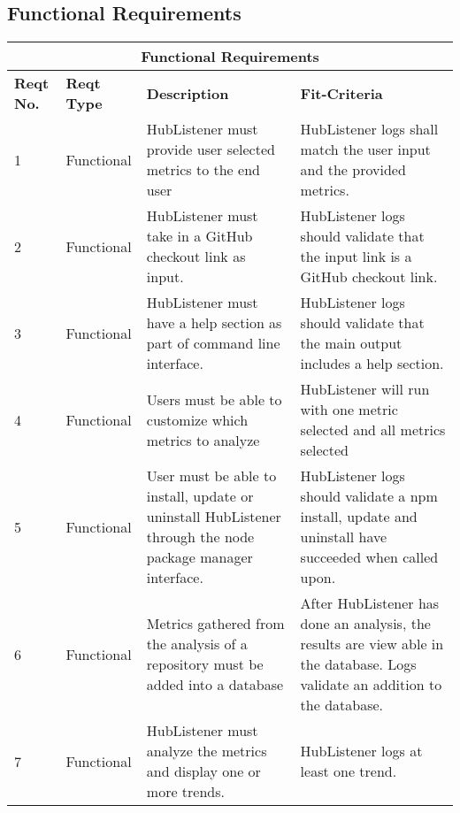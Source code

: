 \documentclass{article}
\begin{document}
\subsection{Functional Requirements }
\begin{tabular}{ |p{1cm}|p{2cm}|p{5cm}|p{3cm}|  }
\hline
\multicolumn{4}{|c|}{\textbf{Functional Requirements}} \\
\hline
\textbf{Reqt No.} & \textbf{Reqt Type} & \textbf{Description} & \textbf{Fit-Criteria}\\
\hline 
1 & Functional & HubListener must provide user selected metrics to the end user & HubListener logs shall match the user input and the provided metrics.\\
\hline 
2 & Functional & HubListener must take in a GitHub checkout link as input. & HubListener logs should validate that the input link is a GitHub checkout link.\\
\hline 
3 & Functional & HubListener must have a help section as part of command line interface. & HubListener logs should validate that the main output includes a help section.\\ 
\hline 
4 & Functional & Users must be able to customize which metrics to analyze & HubListener will run with one metric selected and all metrics selected\\
\hline 
5 & Functional & User must be able to install, update or uninstall HubListener through the node package manager interface. & HubListener logs should validate a npm install, update and uninstall have succeeded when called upon. \\
\hline 
6 & Functional & Metrics gathered from the analysis of a repository must be added into a database & After HubListener has done an analysis, the results are view able in the database. Logs validate an addition to the database.  \\
\hline 
7 & Functional & HubListener must analyze the metrics and display one or more trends. & HubListener logs at least one trend. \\
\hline
\end{tabular}
\end{document}
